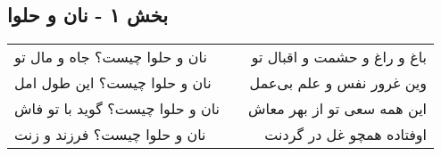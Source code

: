\begin{center}
\section*{بخش ۱ - نان و حلوا}
\label{sec:001}
\begin{longtable}{l p{0.5cm} r}
نان و حلوا چیست؟ جاه و مال تو
&&
باغ و راغ و حشمت و اقبال تو
\\
نان و حلوا چیست؟ این طول امل
&&
وین غرور نفس و علم بی‌عمل
\\
نان و حلوا چیست؟ گوید با تو فاش
&&
این همه سعی تو از بهر معاش
\\
نان و حلوا چیست؟ فرزند و زنت
&&
اوفتاده همچو غل در گردنت
\\
\end{longtable}
\end{center}
